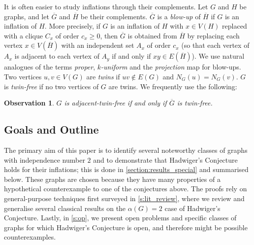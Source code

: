 \documentclass[11pt]{article}
\numberwithin{equation}{section}
\theoremstyle{plain}
\newtheorem{obs}[equation]{Observation}
\theoremstyle{definition}
\renewcommand{\geq}{\geqslant}
\newcommand{\defn}[1]{\textcolor{green!50!black}{\textit{#1}}}
\begin{document}
It is often easier to study inflations through their complements. Let $G$ and $H$ be graphs, and let $\overline{G}$ and $\overline{H}$ be their complements. $\overline{G}$ is a \defn{blow-up} of $\overline{H}$ if $G$ is an inflation of $H$. More precisely, if $G$ is an inflation of $H$ with $x \in V(H)$ replaced with a clique $C_x$ of order $c_x \geq 0$, then $\overline{G}$ is obtained from $\overline{H}$ by replacing each vertex $x \in V(\overline{H})$ with an independent set $A_x$ of order $c_x$ (so that each vertex of $A_x$ is adjacent to each vertex of $A_y$ if and only if $xy \in E(\overline{H})$). We use natural analogues of the terms \defn{proper}, \defn{$k$-uniform} and the \defn{projection} map for blow-ups. Two vertices $u, v \in V(G)$ are \defn{twins} if $uv \notin E(G)$ and $N_G(u) = N_G(v)$. $G$ is \defn{twin-free} if no two vertices of $G$ are twins.
We frequently use the following:
\begin{obs}
    $G$ is adjacent-twin-free if and only if $\overline{G}$ is twin-free.
\end{obs}

\subsection{Goals and Outline}
\label{ss:goals_outline}
The primary aim of this paper is to identify several noteworthy classes of graphs with independence number $2$ and to demonstrate that Hadwiger's Conjecture holds for their inflations; this is done in \cref{section:results_special} and summarised below. These graphs are chosen because they have many properties of a hypothetical counterexample to one of the conjectures above. The proofs rely on general-purpose techniques first surveyed in \cref{s:lit_review}, where we review and generalise several classical results on the $\alpha(G) = 2$ case of Hadwiger's Conjecture. Lastly, in \cref{s:op}, we present open problems and specific classes of graphs for which Hadwiger's Conjecture is open, and therefore might be possible counterexamples.
\end{document}
